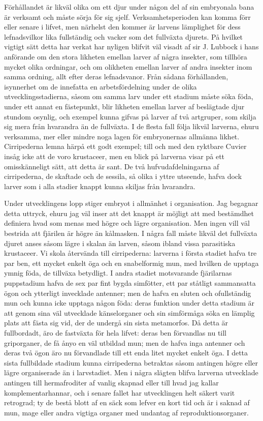 Förhållandet är likväl olika om ett djur under någon del af sin embryonala bana är verksamt och måste sörja för sig sjelf. Verksamhetsperioden kan komma förr eller senare i lifvet, men närhelst den kommer är larvens lämplighet för dess lefnadsvilkor lika fullständig och vacker som det fullväxta djurets. På hvilket vigtigt sätt detta har verkat har nyligen blifvit väl visadt af sir J. Lubbock i hans anförande om den stora likheten emellan larver af några insekter, som tillhöra mycket olika ordningar, och om olikheten emellan larver af andra insekter inom samma ordning, allt efter deras lefnadsvanor. Från sådana förhållanden, isynnerhet om de innefatta en arbetsfördelning under de olika utvecklingsstadierna, såsom om samma larv under ett stadium måste söka föda, under ett annat en fästepunkt, blir likheten emellan larver af beslägtade djur stundom osynlig, och exempel kunna gifvas på larver af två artgruper, som skilja sig mera från hvarandra än de fullväxta. I de flesta fall följa likväl larverna, ehuru verksamma, mer eller mindre noga lagen för embryonernas allmänna likhet. Cirripederna lemna härpå ett godt exempel; till och med den ryktbare Cuvier insåg icke att de voro krustaceer, men en blick på larverna visar på ett omisskänneligt sätt, att detta är sant. De två hufvudafdelningarna af cirripederna, de skaftade och de sessila, så olika i yttre utseende, hafva dock larver som i alla stadier knappt kunna skiljas från hvarandra.

Under utvecklingens lopp stiger embryot i allmänhet i organisation. Jag begagnar detta uttryck, ehuru jag väl inser att det knappt är möjligt att med bestämdhet definiera hvad som menas med högre och lägre organisation. Men ingen vill väl bestrida att fjärilen är högre än kålmasken. I några fall måste likväl det fullväxta djuret anses såsom lägre i skalan än larven, såsom ibland vissa parasitiska krustaceer. Vi skola återvända till cirripederna: larverna i första stadiet hafva tre par ben, ett mycket enkelt öga och en snabelformig mun, med hvilken de upptaga ymnig föda, de tillväxa betydligt. I andra stadiet motsvarande fjärilarnas puppstadium hafva de sex par fint bygda simfötter, ett par ståtligt sammansatta ögon och ytterligt invecklade antenner; men de hafva en sluten och ofullständig mun och kunna icke upptaga någon föda: deras funktion under detta stadium är att genom sina väl utvecklade känselorganer och sin simförmåga söka en lämplig plats att fästa sig vid, der de undergå sin sista metamorfos. Då detta är fullbordadt, äro de fastväxta för hela lifvet: deras ben förvandlas nu till griporganer, de få ånyo en väl utbildad mun; men de hafva inga antenner och deras två ögon äro nu förvandlade till ett enda litet mycket enkelt öga. I detta sista fullbildade stadium kunna cirripederna betraktas såsom antingen högre eller lägre organiserade än i larvstadiet. Men i några slägten blifva larverna utvecklade antingen till hermafroditer af vanlig skapnad eller till hvad jag kallar komplementarhannar, och i senare fallet har utvecklingen helt säkert varit retrograd; ty de bestå blott af en säck som lefver en kort tid och är i saknad af mun, mage eller andra vigtiga organer med undantag af reproduktionsorganer.

